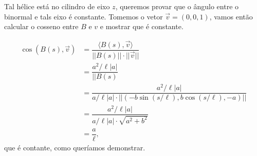 \documentclass[12pt,letterpaper]{article}
\begin{document}
\begin{enumerate}
	Tal hélice está no cilindro de eixo $z$, queremos provar que o ângulo entre o binormal e tals eixo é constante. Tomemos o vetor $\vec v=(0,0,1)$, vamos então calcular o cosseno entre $B$ e $v$ e mostrar que é constante.
	
	\begin{align*}
		\cos(B(s),\vec v)&=\dfrac{\langle B(s),\vec v\rangle}{||B(s)||\cdot||\vec v||}\\
		&=\dfrac{a^2/\ell|a|}{||B(s)}\\
		&=\dfrac{a^2/\ell|a|}{a/\ell|a|\cdot ||(-b\sin(s/\ell),b\cos(s/\ell),-a)||}\\
		&=\dfrac{a^2/\ell|a|}{a/\ell|a|\cdot \sqrt{a^2+b^2}}\\
		&=\dfrac{a}{\ell},
	\end{align*}
	que é contante, como queríamos demonstrar.
	\end{enumerate}
	\newpage



\end{document}
